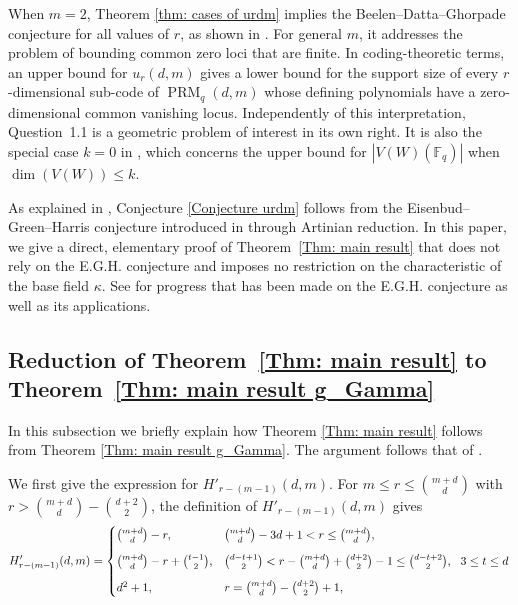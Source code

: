 \documentclass[11pt]{amsart}
\theoremstyle{definition}
\newcommand{\Fq}{\mathbb F_q}
\begin{document}
When $m=2$, Theorem \ref{thm: cases of urdm} implies the
Beelen--Datta--Ghorpade conjecture for all values of $r$, as shown in
\cite[Section~6]{lin2026largest}. For general $m$, it addresses the
problem of bounding common zero loci that are finite. In coding-theoretic
terms, an upper bound for $u_r(d,m)$ gives a lower bound for the support
size of every $r$-dimensional sub-code of $\operatorname{PRM}_q(d,m)$ whose
defining polynomials have a zero-dimensional common vanishing locus.
Independently of this interpretation, Question~1.1 is a geometric problem
of interest in its own right. It is also the special case $k=0$ in  \cite[Conjecture~1.5]{lin2026k}, which concerns the upper bound for $|V(W)(\Fq)|$ when $\dim(V(W)) \leq k$.

As explained in
\cite[Proposition~3.1]{lin2026k}, Conjecture \ref{Conjecture urdm} follows from the Eisenbud--Green--Harris conjecture introduced in \cite{eisenbud1993authors} through
Artinian reduction. In this paper, we give a direct, elementary proof of Theorem~\ref{Thm: main result}
that does not rely on the E.G.H. conjecture and imposes no restriction
on the characteristic of the base field $\kappa$.
See \cite{caviglia2021eisenbud, gunturkun2021survey} for progress that has been made on the E.G.H. conjecture as well as its applications.


\subsection{Reduction of Theorem~\ref{Thm: main result} to Theorem~\ref{Thm: main result g_Gamma}}
In this subsection we briefly explain how Theorem \ref{Thm: main result} follows from Theorem \ref{Thm: main result g_Gamma}. The argument follows that of \cite[Lemma~5.5, Theorem~5.7]{lin2026largest}.

We first give the expression for $H'_{r-(m-1)}(d,m)$. For $m\leq r\leq\binom{m+d}{d}$ with
$r>\binom{m+d}{d}-\binom{d+2}{2}$, the definition of $H'_{r-(m-1)}(d,m)$ gives
\[
H'_{r-(m-1)}(d,m)=
\begin{cases}
\tbinom{m+d}{d}-r,
& \tbinom{m+d}{d}-3d+1<r\leq\tbinom{m+d}{d},\\[8pt]
\tbinom{m+d}{d}-r+\binom{t-1}{2},
& \tbinom{d-t+1}{2}
  <r-\tbinom{m+d}{d}+\tbinom{d+2}{2}-1
  \leq\tbinom{d-t+2}{2}, \ \ 3\leq t\leq d\\[8pt]
d^2+1,
& r=\tbinom{m+d}{d}-\tbinom{d+2}{2}+1,
\end{cases}
\]
\end{document}
